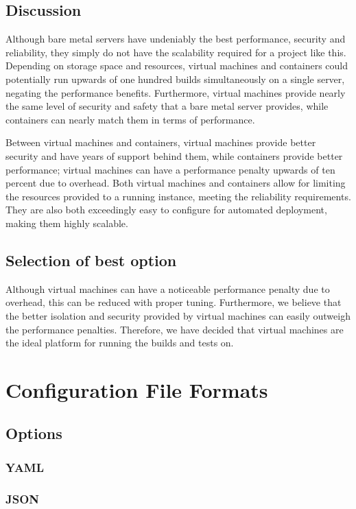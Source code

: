 \documentclass[10pt,letterpaper,onecolumn,journal]{IEEEtran}
\begin{document}
\subsection{Discussion}
Although bare metal servers have undeniably the best performance, security and reliability, they simply do not have the scalability required for a project like this. Depending on storage space and resources, virtual machines and containers could potentially run upwards of one hundred builds simultaneously on a single server, negating the performance benefits. Furthermore, virtual machines provide nearly the same level of security and safety that a bare metal server provides, while containers can nearly match them in terms of performance.

Between virtual machines and containers, virtual machines provide better security and have years of support behind them, while containers provide better performance; virtual machines can have a performance penalty upwards of ten percent due to overhead.\cite{RC25482} Both virtual machines and containers allow for limiting the resources provided to a running instance, meeting the reliability requirements. They are also both exceedingly easy to configure for automated deployment, making them highly scalable.
\subsection{Selection of best option}
Although virtual machines can have a noticeable performance penalty due to overhead, this can be reduced with proper tuning. Furthermore, we believe that the better isolation and security provided by virtual machines can easily outweigh the performance penalties. Therefore, we have decided that virtual machines are the ideal platform for running the builds and tests on.

\section{Configuration File Formats}
\subsection{Options}
\subsubsection{YAML}
\subsubsection{JSON}
\end{document}
